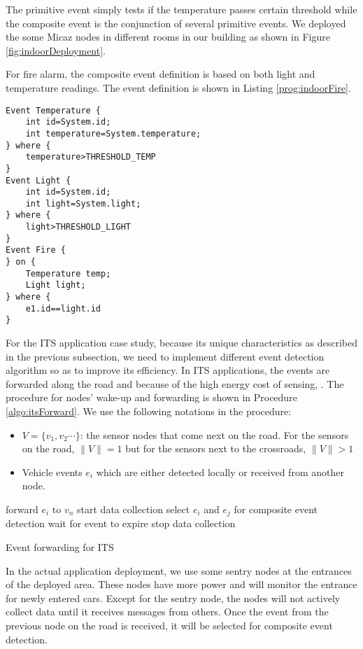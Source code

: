 The primitive event simply tests if the temperature passes certain threshold while the composite event is the conjunction of several primitive events. We deployed the some Micaz nodes in different rooms in our building as shown in Figure \ref{fig:indoorDeployment}.

For fire alarm, the composite event definition is based on both light and temperature readings. The event definition is shown in Listing \ref{prog:indoorFire}.
\begin{lstlisting}[caption=Event definition for fire alarm, label=prog:indoorFire]
Event Temperature {
	int id=System.id;
	int temperature=System.temperature;
} where {
	temperature>THRESHOLD_TEMP
}
Event Light {
	int id=System.id;
	int light=System.light;
} where {
	light>THRESHOLD_LIGHT
}
Event Fire {
} on {
	Temperature temp;
	Light light;
} where {
	e1.id==light.id
}
\end{lstlisting}

For the ITS application case study, because its unique characteristics as described in the previous subsection, we need to implement different event detection algorithm so as to improve its efficiency. In ITS applications, the events are forwarded along the road and because of the high energy cost of sensing, . The procedure for nodes' wake-up and forwarding is shown in Procedure \ref{algo:itsForward}. We use the following notations in the procedure:
\begin{itemize}
\item \(V=\{v_1, v_2 \cdots \}\): the sensor nodes that come next on the road. For the sensors on the road, \(\|V\|=1\) but for the sensors next to the crossroads, \(\|V\|>1\)
\item Vehicle events \(e_i\) which are either detected locally or received from another node.
\end{itemize}

\begin{algorithm}
\begin{algorithmic}
			\STATE forward \(e_i\) to \(v_n\)
		\ENDFOR
	\ENDIF
		\STATE start data collection
			\STATE select \(e_i\) and \(e_j\) for composite event detection
		\ELSE
			\STATE wait for event to expire
		\ENDIF
		\STATE stop data collection
	\ENDIF
\end{algorithmic}
\caption{Event forwarding for ITS}
\label{algo:itsForward}
\end{algorithm}

In the actual application deployment, we use some sentry nodes at the entrances of the deployed area. These nodes have more power and will monitor the entrance for newly entered cars. Except for the sentry node, the nodes will not actively collect data until it receives messages from others. Once the event from the previous node on the road is received, it will be selected for composite event detection.